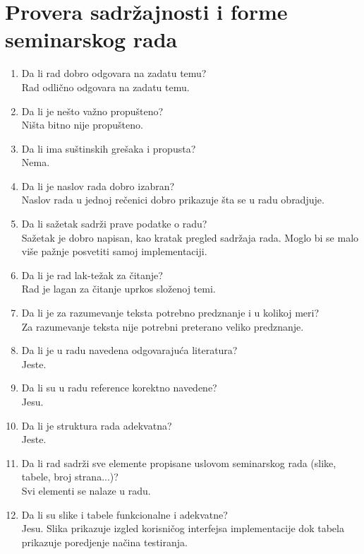 \documentclass[a4paper]{report}
\begin{document}
\section{Provera sadržajnosti i forme seminarskog rada}

\begin{enumerate}
\item Da li rad dobro odgovara na zadatu temu?\\
Rad odlično odgovara na zadatu temu. 
\item Da li je nešto važno propušteno?\\
Ništa bitno nije propušteno.
\item Da li ima suštinskih grešaka i propusta?\\
Nema.
\item Da li je naslov rada dobro izabran?\\
Naslov rada u jednoj rečenici dobro prikazuje šta se u radu obradjuje.
\item Da li sažetak sadrži prave podatke o radu?\\
Sažetak je dobro napisan, kao kratak pregled sadržaja rada. Moglo bi se malo više pažnje posvetiti samoj implementaciji.
\item Da li je rad lak-težak za čitanje?\\
Rad je lagan za čitanje uprkos složenoj temi.
\item Da li je za razumevanje teksta potrebno predznanje i u kolikoj meri?\\
Za razumevanje teksta nije potrebni preterano veliko predznanje.
\item Da li je u radu navedena odgovarajuća literatura?\\
Jeste.
\item Da li su u radu reference korektno navedene?\\
Jesu.
\item Da li je struktura rada adekvatna?\\
Jeste.
\item Da li rad sadrži sve elemente propisane uslovom seminarskog rada (slike, tabele, broj strana...)?\\
Svi elementi se nalaze u radu.
\item Da li su slike i tabele funkcionalne i adekvatne?\\
Jesu. Slika prikazuje izgled korisničog interfejsa implementacije dok tabela prikazuje poredjenje načina testiranja.
\end{enumerate}
\end{document}
